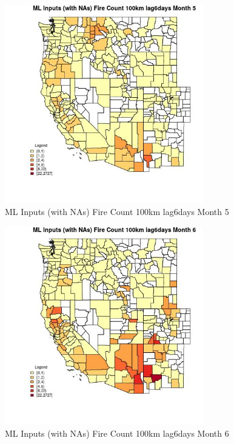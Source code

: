 \begin{figure} 
\centering  
\includegraphics[width=0.77\textwidth]{Code_Outputs/Report_ML_input_PM25_Step4_part_f_de_duplicated_aveswNAs_CountyFire_Count_100km_lag6daysmedianMonth5.jpg} 
\caption{\label{fig:Report_ML_input_PM25_Step4_part_f_de_duplicated_aveswNAsCountyFire_Count_100km_lag6daysmedianMonth5}ML Inputs (with NAs) Fire Count 100km lag6days Month 5} 
\end{figure} 
 

\begin{figure} 
\centering  
\includegraphics[width=0.77\textwidth]{Code_Outputs/Report_ML_input_PM25_Step4_part_f_de_duplicated_aveswNAs_CountyFire_Count_100km_lag6daysmedianMonth6.jpg} 
\caption{\label{fig:Report_ML_input_PM25_Step4_part_f_de_duplicated_aveswNAsCountyFire_Count_100km_lag6daysmedianMonth6}ML Inputs (with NAs) Fire Count 100km lag6days Month 6} 
\end{figure} 
 


